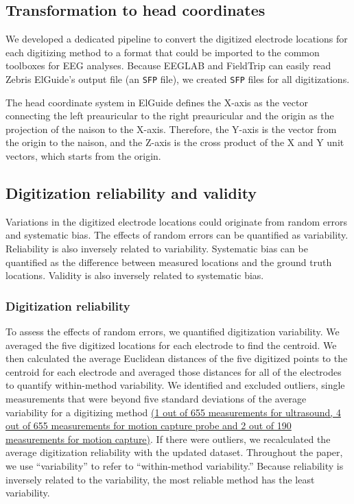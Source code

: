 \documentclass[../thesis_seyed.tex]{subfiles}
\begin{document}
\subsection{Transformation to head coordinates}
We developed a dedicated pipeline to convert the digitized electrode locations for each digitizing method to a format that could be imported to the common toolboxes for EEG analyses. Because EEGLAB and FieldTrip can easily read Zebris ElGuide's output file (an {\tt SFP} file), we created {\tt SFP} files for all digitizations.

The head coordinate system in ElGuide defines the X-axis as the vector connecting the left preauricular to the right preauricular and the origin as the projection of the naison to the X-axis. Therefore, the Y-axis is the vector from the origin to the naison, and the Z-axis is the cross product of the X and Y unit vectors, which starts from the origin.

\subsection{Digitization reliability and validity}
Variations in the digitized electrode locations could originate from random errors and systematic bias. The effects of random errors can be quantified as variability. Reliability is also inversely related to variability. Systematic bias can be quantified as the difference between measured locations and the ground truth locations. Validity is also inversely related to systematic bias.

\subsubsection{Digitization reliability}
\label{subsec:digitRel}
To assess the effects of random errors, we quantified digitization variability. We averaged the five digitized locations for each electrode to find the centroid. We then calculated the average Euclidean distances of the five digitized points to the centroid for each electrode and averaged those distances for all of the electrodes to quantify within-method variability. We identified and excluded outliers, single measurements that were beyond five standard deviations of the average variability for a digitizing method \ul{(1 out of 655 measurements for ultrasound, 4 out of 655 measurements for motion capture probe and 2 out of 190 measurements for motion capture)}. If there were outliers, we recalculated the average digitization reliability with the updated dataset. Throughout the paper, we use ``variability'' to refer to ``within-method variability.'' Because reliability is inversely related to the variability, the most reliable method has the least variability. 
\end{document}

